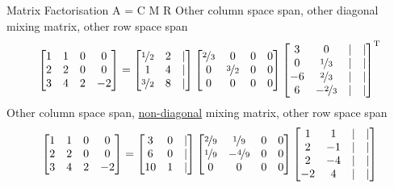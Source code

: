 \documentclass[mathserif, aspectratio=1610]{intbeamer}
\begin{document}
\begin{frame}{Matrix Factorisation A = C M R}
\vspace{-1em}
Other column space span, other diagonal mixing matrix, other row space span
$$
\begin{bmatrix}
1 & 1 & 0 & 0\\
2 & 2 & 0 & 0\\
3 & 4 & 2 & -2
\end{bmatrix}
=
\begin{bmatrix}
\nicefrac{1}{2} & 2 & |\\
1 & 4 & |\\
\nicefrac{3}{2} & 8 & |
\end{bmatrix}
\begin{bmatrix}
\nicefrac{2}{3} & 0 & 0 & 0\\
0 & \nicefrac{3}{2} & 0 & 0\\
0 & 0 & 0 & 0\\
\end{bmatrix}
\begin{bmatrix}
3&0 & | & |\\
0&\nicefrac{1}{3} & | & |\\
-6&\nicefrac{2}{3} & | & |\\
6&-\nicefrac{2}{3} & | & |\\
\end{bmatrix}
^\mathrm{T}
$$
\pause
Other column space span, \underline{non-diagonal} mixing matrix, other row space span
$$
\begin{bmatrix}
1 & 1 & 0 & 0\\
2 & 2 & 0 & 0\\
3 & 4 & 2 & -2
\end{bmatrix}
=
\begin{bmatrix}
3 & 0 & |\\
6 & 0 & |\\
10 & 1 & |
\end{bmatrix}
\begin{bmatrix}
\nicefrac{2}{9} & \nicefrac{1}{9} & 0 & 0\\
\nicefrac{1}{9} & -\nicefrac{4}{9} & 0 & 0\\
0 & 0 & 0 & 0\\
\end{bmatrix}
\begin{bmatrix}
1&1 & | & |\\
2&-1 & | & |\\
2&-4 & | & |\\
-2&4 & | & |\\
\end{bmatrix}
$$
\end{frame}
\end{document}
